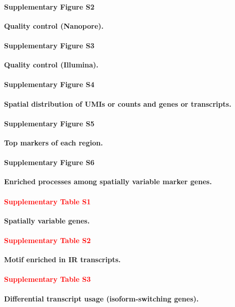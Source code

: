 \documentclass[utf8]{FrontiersinHarvard} %
\newcommand*{\red}{\textcolor{red}}
\begin{document}
\paragraph*{Supplementary Figure S2}
\label{fig:S2}
{\bf Quality control (Nanopore).}

\paragraph*{Supplementary Figure S3}
\label{fig:S3}
{\bf Quality control (Illumina).}

\paragraph*{Supplementary Figure S4}
\label{fig:S4}
{\bf Spatial distribution of UMIs or counts and genes or transcripts.}

\paragraph*{Supplementary Figure S5}
\label{fig:S5}
{\bf Top markers of each region.}

\paragraph*{Supplementary Figure S6}
\label{fig:S6}
{\bf Enriched processes among spatially variable marker genes.}


\paragraph*{\red{Supplementary Table S1}}
\label{tab:tabS1}
{\bf Spatially variable genes.}

\paragraph*{\red{Supplementary Table S2}}
\label{tab:tabS2}
{\bf Motif enriched in IR transcripts.}

\paragraph*{\red{Supplementary Table S3}}
\label{tab:tabS3}
{\bf Differential transcript usage (isoform-switching genes).}


\end{document}
